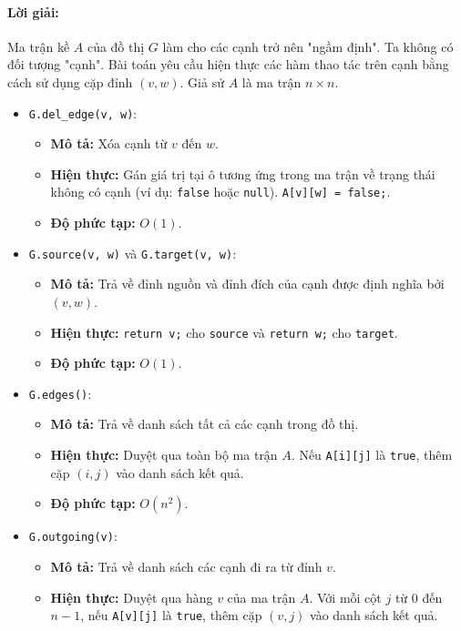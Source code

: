 \documentclass[a4paper,12pt]{article}
\begin{document}
\paragraph{Lời giải:}
Ma trận kề $A$ của đồ thị $G$ làm cho các cạnh trở nên "ngầm định". Ta không có đối tượng "cạnh". Bài toán yêu cầu hiện thực các hàm thao tác trên cạnh bằng cách sử dụng cặp đỉnh $(v, w)$. Giả sử $A$ là ma trận $n \times n$.
\begin{itemize}
    \item \texttt{G.del\_edge(v, w)}:
        \begin{itemize}
            \item \textbf{Mô tả:} Xóa cạnh từ $v$ đến $w$.
            \item \textbf{Hiện thực:} Gán giá trị tại ô tương ứng trong ma trận về trạng thái không có cạnh (ví dụ: \texttt{false} hoặc \texttt{null}). \texttt{A[v][w] = false;}.
            \item \textbf{Độ phức tạp:} $O(1)$.
        \end{itemize}
    \item \texttt{G.source(v, w)} và \texttt{G.target(v, w)}:
        \begin{itemize}
            \item \textbf{Mô tả:} Trả về đỉnh nguồn và đỉnh đích của cạnh được định nghĩa bởi $(v, w)$.
            \item \textbf{Hiện thực:} \texttt{return v;} cho \texttt{source} và \texttt{return w;} cho \texttt{target}.
            \item \textbf{Độ phức tạp:} $O(1)$.
        \end{itemize}
    \item \texttt{G.edges()}:
        \begin{itemize}
            \item \textbf{Mô tả:} Trả về danh sách tất cả các cạnh trong đồ thị.
            \item \textbf{Hiện thực:} Duyệt qua toàn bộ ma trận $A$. Nếu \texttt{A[i][j]} là \texttt{true}, thêm cặp $(i, j)$ vào danh sách kết quả.
            \item \textbf{Độ phức tạp:} $O(n^2)$.
        \end{itemize}
    \item \texttt{G.outgoing(v)}:
        \begin{itemize}
            \item \textbf{Mô tả:} Trả về danh sách các cạnh đi ra từ đỉnh $v$.
            \item \textbf{Hiện thực:} Duyệt qua hàng $v$ của ma trận $A$. Với mỗi cột $j$ từ $0$ đến $n-1$, nếu \texttt{A[v][j]} là \texttt{true}, thêm cặp $(v, j)$ vào danh sách kết quả.

\end{itemize}
\end{itemize}
\end{document}
